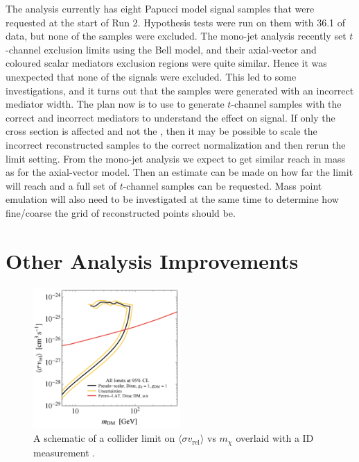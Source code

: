 The \monoZ analysis currently has eight Papucci model signal samples that were requested at the start of Run 2. Hypothesis tests were run on them with 36.1 \ifb of data, but none of the samples were excluded. The mono-jet analysis recently set $t$-channel exclusion limits using the Bell model, and their axial-vector and coloured scalar mediators exclusion regions were quite similar. Hence it was unexpected that none of the \monoZ signals were excluded. This led to some investigations, and it turns out that the \monoZ samples were generated with an incorrect mediator width. The plan now is to use \madgraph to generate $t$-channel samples with the correct and incorrect mediators to understand the effect on signal. If only the cross section is affected and not the \etmiss, then it may be possible to scale the incorrect reconstructed samples to the correct normalization and then rerun the limit setting. From the mono-jet analysis we expect to get similar reach in mass as for the axial-vector model. Then an estimate can be made on how far the limit will reach and a full set of $t$-channel samples can be requested. Mass point emulation will also need to be investigated at the same time to determine how fine/coarse the grid of reconstructed points should be.

\section{Other Analysis Improvements}

\begin{figure}[h]
\centering
\includegraphics[width=0.5\textwidth]{Figures/id.png}
\caption{A schematic of a collider limit on $\langle \sigma v_\text{rel} \rangle$ vs $m_\chi$ overlaid with a ID measurement \cite{Boveia:2016mrp}.}
\label{fig:id}
\end{figure}

